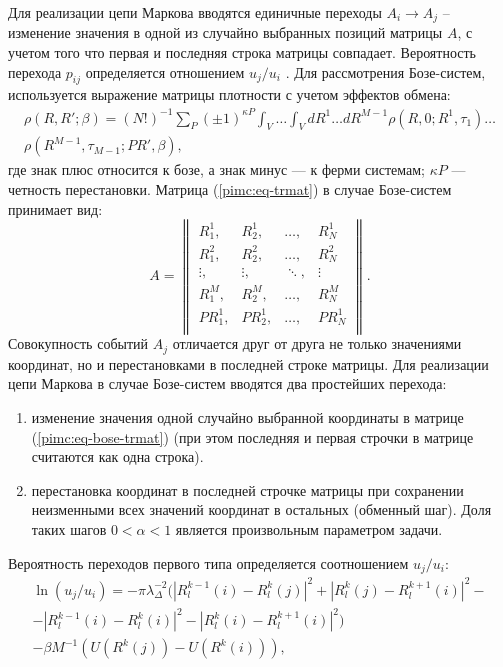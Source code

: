 Для реализации цепи Маркова вводятся единичные переходы $A_i \longrightarrow A_j$ -- изменение значения в одной из случайно выбранных позиций матрицы $A$, с учетом того что первая и последняя строка матрицы совпадает. Вероятность перехода $p_{ij}$ определяется отношением $u_j/u_i$ .
Для рассмотрения Бозе-систем, используется выражение матрицы плотности с учетом эффектов обмена:
\begin{multline}
	\label{pimc:eq-rho-bf}
	\rho(R,R';\beta) = (N!)^{-1}\sum_P (\pm 1)^{\kappa P} \int_V \dots \int_V dR^1 \dots dR^{M-1} \rho(R,0; R^1, \tau_1) \dots \\
    \rho(R^{M-1}, \tau_{M-1}; PR', \beta),
\end{multline}
где знак плюс относится к бозе, а знак минус --- к ферми системам; $\kappa P$ --- четность перестановки.
Матрица (\ref{pimc:eq-trmat}) в случае Бозе-систем принимает вид:
\begin{equation}
\label{pimc:eq-bose-trmat}
A=
	\begin{Vmatrix}
	R_1^1, &R_2^1, &\dots, &R_N^1\\
	R_1^2, &R_2^2, &\dots, &R_N^2\\
	\vdots, &\vdots, &\ddots, &\vdots \\
	R_1^M, &R_2^M, &\dots, &R_N^M\\
	PR_1^{1}, &PR_2^{1}, &\dots, &PR_N^{1}\\
	\end{Vmatrix}.
\end{equation} 
Совокупность событий $A_j$ отличается друг от друга не только значениями координат, но и перестановками в последней строке матрицы. Для реализации цепи Маркова в случае Бозе-систем вводятся два простейших перехода:
\begin{enumerate}
	\item изменение значения одной случайно выбранной координаты в матрице (\ref{pimc:eq-bose-trmat}) (при этом последняя и первая строчки в матрице считаются как одна строка).
	\item перестановка координат в последней строчке матрицы при сохранении неизменными всех значений координат в остальных (обменный шаг). Доля таких шагов $0<\alpha<1$ является произвольным параметром задачи.
\end{enumerate}
Вероятность переходов первого типа определяется соотношением $u_j/u_i$:
\begin{multline}
	\label{pimc:eq-loguij}
	\ln (u_j/u_i) = -\pi \lambda_\Delta^{-2} ( |R_l^{k-1}(i) - R_l^k(j)|^2 + | R^k_l(j) - R_l^{k+1}(i) |^2 - \\
		- | R^{k-1}_l(i) - R_l^k(i) |^2 - | R^k_l(i) - R_l^{k+1}(i) |^2 ) \\
		-\beta M^{-1} ( U(R^k(j)) - U(R^k(i))  ),
\end{multline} 
